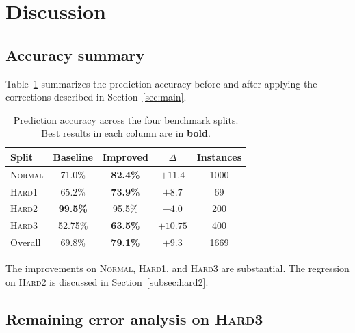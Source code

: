 \section{Discussion}\label{sec:discussion}

\subsection{Accuracy summary}

Table~\ref{tab:results} summarizes the prediction accuracy before
and after applying the corrections described in Section~\ref{sec:main}.

\begin{table}[ht]
\centering
\caption{Prediction accuracy across the four benchmark splits.
Best results in each column are in \textbf{bold}.}\label{tab:results}
\begin{tabular}{@{}lcccc@{}}
\toprule
Split & Baseline & Improved & $\Delta$ & Instances \\
\midrule
\textsc{Normal} & 71.0\% & \textbf{82.4\%} & $+11.4$ & 1000 \\
\textsc{Hard1}  & 65.2\% & \textbf{73.9\%} & $+8.7$  & 69 \\
\textsc{Hard2}  & \textbf{99.5\%} & 95.5\% & $-4.0$  & 200 \\
\textsc{Hard3}  & 52.75\% & \textbf{63.5\%} & $+10.75$ & 400 \\
\midrule
Overall         & 69.8\% & \textbf{79.1\%} & $+9.3$  & 1669 \\
\bottomrule
\end{tabular}
\end{table}

The improvements on \textsc{Normal}, \textsc{Hard1}, and
\textsc{Hard3} are substantial.  The regression on \textsc{Hard2}
is discussed in Section~\ref{subsec:hard2}.

\subsection{Remaining error analysis on \textsc{Hard3}}

